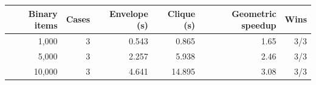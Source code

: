 \begin{tabular}{rrrrrr}
\toprule
Binary items & Cases & Envelope (s) & Clique (s) & Geometric speedup & Wins \\
\midrule
1,000 & 3 & 0.543 & 0.865 & 1.65 & 3/3 \\
5,000 & 3 & 2.257 & 5.938 & 2.46 & 3/3 \\
10,000 & 3 & 4.641 & 14.895 & 3.08 & 3/3 \\
\bottomrule
\end{tabular}
